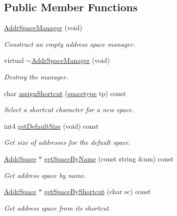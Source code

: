 \subsection*{Public Member Functions}
\begin{DoxyCompactItemize}
\item 
\mbox{\hyperlink{class_addr_space_manager_a7012cd8aa3869a8db478ef71dfd04756}{Addr\+Space\+Manager}} (void)
\begin{DoxyCompactList}\small\item\em Construct an empty address space manager. \end{DoxyCompactList}\item 
virtual \mbox{\hyperlink{class_addr_space_manager_afca145540a3af8f6d35dfc2037580818}{$\sim$\+Addr\+Space\+Manager}} (void)
\begin{DoxyCompactList}\small\item\em Destroy the manager. \end{DoxyCompactList}\item 
char \mbox{\hyperlink{class_addr_space_manager_a1f464efee6e4c596c6cf1b6209889668}{assign\+Shortcut}} (\mbox{\hyperlink{space_8hh_a1a83535cca68b7ca3f25bfad70262231}{spacetype}} tp) const
\begin{DoxyCompactList}\small\item\em Select a shortcut character for a new space. \end{DoxyCompactList}\item 
int4 \mbox{\hyperlink{class_addr_space_manager_ab1b808345dc85dc7e4f8e993fd739f96}{get\+Default\+Size}} (void) const
\begin{DoxyCompactList}\small\item\em Get size of addresses for the default space. \end{DoxyCompactList}\item 
\mbox{\hyperlink{class_addr_space}{Addr\+Space}} $\ast$ \mbox{\hyperlink{class_addr_space_manager_a24efffb904ebb1a0a541fa74cafd51fc}{get\+Space\+By\+Name}} (const string \&nm) const
\begin{DoxyCompactList}\small\item\em Get address space by name. \end{DoxyCompactList}\item 
\mbox{\hyperlink{class_addr_space}{Addr\+Space}} $\ast$ \mbox{\hyperlink{class_addr_space_manager_aa69937486b7d2b062011ac39d5513ee3}{get\+Space\+By\+Shortcut}} (char sc) const
\begin{DoxyCompactList}\small\item\em Get address space from its shortcut. \end{DoxyCompactList}\item 

\end{DoxyCompactItemize}
